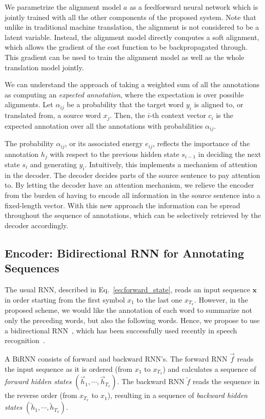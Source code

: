 \documentclass{article} %
\newcommand{\vect}[1]{\mathbf{#1}}
\newcommand{\vx}[0]{\vect{x}}
\newcommand{\ola}{\overleftarrow}
\newcommand{\ora}{\overrightarrow}
\begin{document}
We parametrize the alignment model $a$ as a feedforward neural network which is
jointly trained with all the other components of the proposed system.  Note
that unlike in traditional machine translation, the alignment is not considered
to be a latent variable. Instead, the alignment model directly computes a soft
alignment, which allows the gradient of the cost function to be backpropagated
through. This gradient can be used to train the alignment model as well as the
whole translation model jointly.

We can understand the approach of taking a weighted sum of all the annotations
as computing an {\em expected annotation}, where the expectation is over
possible alignments.  Let $\alpha_{ij}$ be a probability that the target word
$y_i$ is aligned to, or translated from, a source word $x_j$. Then, the $i$-th
context vector $c_i$ is the expected annotation over all the annotations with
probabilities $\alpha_{ij}$.

The probability $\alpha_{ij}$, or its associated energy $e_{ij}$, reflects the
importance of the annotation $h_j$ with respect to the previous hidden state
$s_{i-1}$ in deciding the next state $s_i$ and generating $y_i$.  Intuitively,
this implements a mechanism of attention in the decoder. The decoder decides
parts of the source sentence to pay attention to. By letting the decoder have an
attention mechanism, we relieve the encoder from the burden of having to encode
all information in the source sentence into a fixed-length vector. With this new
approach the information can be spread throughout the sequence of annotations,
which can be selectively retrieved by the decoder accordingly.

\subsection{Encoder: Bidirectional RNN for Annotating Sequences}
\label{sec:birnn_encoder}

The usual RNN, described in Eq.~\eqref{eq:forward_state}, reads an input
sequence $\vx$ in order starting from the first symbol $x_1$ to the last one
$x_{T_x}$. However, in the proposed scheme, we would like the annotation of each
word to summarize not only the preceding words, but also the following words.
Hence, we propose to use a bidirectional RNN~\citep[BiRNN, ][]{Schuster1997},
which has been successfully used recently in speech recognition~\citep[see,
e.g.,][]{Graves2013asru}. 

A BiRNN consists of forward and backward RNN's. The forward RNN $\ora{f}$ reads
the input sequence as it is ordered (from $x_1$ to $x_{T_x}$) and calculates a
sequence of {\it forward hidden states} $( \ora{h}_1, \cdots, \ora{h}_{T_x})$.
The backward RNN $\ola{f}$ reads the sequence in the reverse order (from
$x_{T_x}$ to $x_1$), resulting in a sequence of {\it backward hidden states} $(
\ola{h}_1, \cdots, \ola{h}_{T_x})$. 
\end{document}
